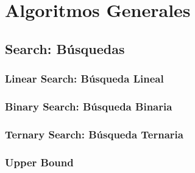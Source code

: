 \documentclass[12pt, fleqn]{report}                             %
\theoremstyle{break}                                            %
\begin{document}
\part{Algoritmos Generales}
    
    \clearpage
    \chapter{Search: Búsquedas}

        \section{Linear Search: Búsqueda Lineal}

        \section{Binary Search: Búsqueda Binaria}

        \section{Ternary Search: Búsqueda Ternaria}

        \section{Upper Bound}

\end{document}
